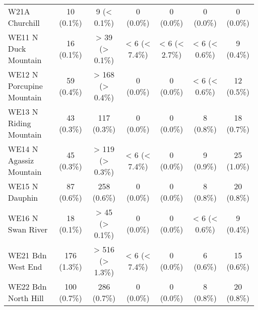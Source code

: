 \documentclass{article}
\begin{document}
\begin{table}[htbp]
\begin{longtable}{l*{6}{c}}
  W21A Churchill                                        &            10 (0.1\%)           &           9 (< 0.1\%)           &            0 (0.0\%)            &            0 (0.0\%)            &            0 (0.0\%)            &            0 (0.0\%)            \\
  WE11 N Duck Mountain                                  &            16 (0.1\%)           &          > 39 (> 0.1\%)         &          < 6 (< 7.4\%)          &          < 6 (< 2.7\%)          &          < 6 (< 0.6\%)          &            9 (0.4\%)            \\
  WE12 N Porcupine Mountain                             &            59 (0.4\%)           &         > 168 (> 0.4\%)         &            0 (0.0\%)            &            0 (0.0\%)            &          < 6 (< 0.6\%)          &            12 (0.5\%)           \\
  WE13 N Riding Mountain                                &            43 (0.3\%)           &           117 (0.3\%)           &            0 (0.0\%)            &            0 (0.0\%)            &            8 (0.8\%)            &            18 (0.7\%)           \\
  WE14 N Agassiz Mountain                               &            45 (0.3\%)           &         > 119 (> 0.3\%)         &          < 6 (< 7.4\%)          &            0 (0.0\%)            &            9 (0.9\%)            &            25 (1.0\%)           \\
  WE15 N Dauphin                                        &            87 (0.6\%)           &           258 (0.6\%)           &            0 (0.0\%)            &            0 (0.0\%)            &            8 (0.8\%)            &            20 (0.8\%)           \\
  WE16 N Swan River                                     &            18 (0.1\%)           &          > 45 (> 0.1\%)         &            0 (0.0\%)            &            0 (0.0\%)            &          < 6 (< 0.6\%)          &            9 (0.4\%)            \\
  WE21 Bdn West End                                     &           176 (1.3\%)           &         > 516 (> 1.3\%)         &          < 6 (< 7.4\%)          &            0 (0.0\%)            &            6 (0.6\%)            &            15 (0.6\%)           \\
  WE22 Bdn North Hill                                   &           100 (0.7\%)           &           286 (0.7\%)           &            0 (0.0\%)            &            0 (0.0\%)            &            8 (0.8\%)            &            20 (0.8\%)           \\

\end{longtable}
\end{table}
\end{document}
